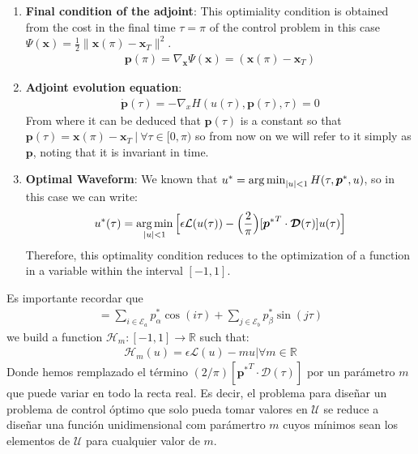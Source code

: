 \begin{enumerate}

    \item \textbf{Final condition of the adjoint}: This optimiality condition is obtained from the cost in the final time $\tau = \pi$ of the control problem in this case $ \Psi (\bm{x}) = \frac {1}{2} \| \bm{x} (\pi) - \bm{x}_T \|^2 $.
    \begin{gather}
        \bm{p}(\pi) = \nabla_{\bm{x}} \Psi(\bm{x}) =  (\bm{x} (\pi) - \bm{x}_T)
    \end{gather}
    \item \textbf{Adjoint evolution equation}: 
    \begin{gather}
        \dot{\bm{p}}(\tau) = -\nabla_x H(u(\tau),\bm{p}(\tau),\tau) = 0
    \end{gather}
    From where it can be deduced that $ \bm {p} (\tau)$ is a constant so that $ \bm {p} (\tau) = \bm {x} (\pi) - \bm { x} _T \ | \ \forall \tau \in [0, \pi) $ so from now on we will refer to it simply as $ \bm {p} $, noting that it is invariant in time.
    \item \textbf{Optimal  Waveform}: We known that $ u^* = \operatorname*{arg\,min}_{|u|<1} H(\tau,\bm{p}^*,u)$, so in this case we can write:
    \begin{gather}
        u^*(\tau) = \operatorname*{arg\,min}_{|u|<1}  \Big[   \epsilon \mathcal{L}(u(\tau)) - \Big(\frac{2}{\pi}\Big)
        [{\bm{p}^*}^T \cdot \bm{\mathcal{D}}(\tau)]
        u(\tau) \Big]
    \end{gather}
    Therefore, this optimality condition reduces to the optimization of a function in a variable within the interval $ [- 1,1] $. 
\end{enumerate}
%
Es importante recordar que 
    \begin{gather}
        [{\bm{p}^*}^T \cdot \bm{\mathcal{D}}(\tau)] = \sum_{i \in \mathcal{E}_a} p^*_\alpha \cos(i\tau) + \sum_{j \in \mathcal{E}_b} p^*_\beta \sin(j\tau) 
    \end{gather}
we build a function $\mathcal{H}_m: [-1,1] \rightarrow \mathbb{R}$ such that:
\begin{gather}
    \mathcal{H}_m(u) = \epsilon \mathcal{L}(u) - mu  |  \forall m \in \mathbb{R}
\end{gather}
Donde hemos remplazado el término $(2/\pi)[{\bm{p}^*}^T \cdot \bm{\mathcal{D}}(\tau)]$ por un parámetro $m$ que puede variar en todo la recta real. Es decir, el problema para diseñar un problema de control óptimo que solo pueda tomar valores en $\mathcal{U}$ se reduce a diseñar una función unidimensional  com parámertro $m$ cuyos mínimos sean los elementos de $\mathcal{U}$ para cualquier valor de $m$. 
